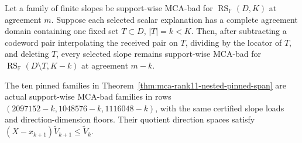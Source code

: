 \begin{theorem}
\label{thm:mca-complete-agreement-shortening}
Let a family of finite slopes be support-wise MCA-bad for
$\operatorname{RS}_{\mathbb F}(D,K)$ at agreement $m$.  Suppose each selected
scalar explanation has a complete agreement domain containing one fixed set
$T\subset D$, $|T|=k<K$.  Then, after subtracting a codeword pair
interpolating the received pair on $T$, dividing by the locator of $T$, and
deleting $T$, every selected slope remains support-wise MCA-bad for
$\operatorname{RS}_{\mathbb F}(D\setminus T,K-k)$ at agreement $m-k$.
\end{theorem}

\begin{corollary}
\label{cor:mca-rank11-source-bound-shortening}
The ten pinned families in Theorem~\ref{thm:mca-rank11-nested-pinned-span}
are actual support-wise MCA-bad families in rows
$(2097152-k,1048576-k,1116048-k)$, with the same certified slope loads and
direction-dimension floors.  Their quotient direction spaces satisfy
$(X-x_{k+1})\widetilde V_{k+1}\le\widetilde V_k$.
\end{corollary}
